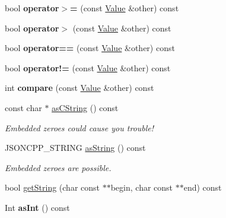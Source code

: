 \begin{DoxyCompactItemize}
\item 
bool {\bfseries operator$>$=} (const \hyperlink{classJson_1_1Value}{Value} \&other) const \hypertarget{classJson_1_1Value_acc13fc47d55abd6e2327b090b83d2911}{}\label{classJson_1_1Value_acc13fc47d55abd6e2327b090b83d2911}

\item 
bool {\bfseries operator$>$} (const \hyperlink{classJson_1_1Value}{Value} \&other) const \hypertarget{classJson_1_1Value_a3124a26067bdfde9571bc89527fc6931}{}\label{classJson_1_1Value_a3124a26067bdfde9571bc89527fc6931}

\item 
bool {\bfseries operator==} (const \hyperlink{classJson_1_1Value}{Value} \&other) const \hypertarget{classJson_1_1Value_a14363dda23a6ae2def9afd1590ae85d3}{}\label{classJson_1_1Value_a14363dda23a6ae2def9afd1590ae85d3}

\item 
bool {\bfseries operator!=} (const \hyperlink{classJson_1_1Value}{Value} \&other) const \hypertarget{classJson_1_1Value_ad0f12d2a4ab74bbef08a05504b2cb81d}{}\label{classJson_1_1Value_ad0f12d2a4ab74bbef08a05504b2cb81d}

\item 
int {\bfseries compare} (const \hyperlink{classJson_1_1Value}{Value} \&other) const \hypertarget{classJson_1_1Value_a899214ed2253d3f4f061b922b0e622b5}{}\label{classJson_1_1Value_a899214ed2253d3f4f061b922b0e622b5}

\item 
const char $\ast$ \hyperlink{classJson_1_1Value_a5b7da48b163bcec63b1424f1608b7da6}{as\+C\+String} () const \hypertarget{classJson_1_1Value_a5b7da48b163bcec63b1424f1608b7da6}{}\label{classJson_1_1Value_a5b7da48b163bcec63b1424f1608b7da6}

\begin{DoxyCompactList}\small\item\em Embedded zeroes could cause you trouble! \end{DoxyCompactList}\item 
J\+S\+O\+N\+C\+P\+P\+\_\+\+S\+T\+R\+I\+NG \hyperlink{classJson_1_1Value_a0f9b76085072127a228206c8e616dcbc}{as\+String} () const \hypertarget{classJson_1_1Value_a0f9b76085072127a228206c8e616dcbc}{}\label{classJson_1_1Value_a0f9b76085072127a228206c8e616dcbc}

\begin{DoxyCompactList}\small\item\em Embedded zeroes are possible. \end{DoxyCompactList}\item 
bool \hyperlink{classJson_1_1Value_a1e0263113ae247a632afac43ebc4149f}{get\+String} (char const $\ast$$\ast$begin, char const $\ast$$\ast$end) const 
\item 
Int {\bfseries as\+Int} () const \hypertarget{classJson_1_1Value_ac786e35b860b1d700cb3d3e56dd6a235}{}\label{classJson_1_1Value_ac786e35b860b1d700cb3d3e56dd6a235}


\end{DoxyCompactItemize}
